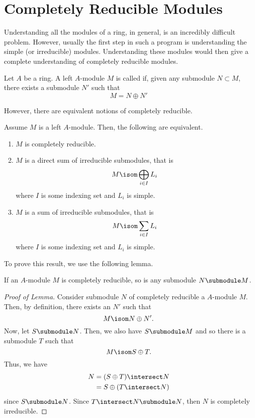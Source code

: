 \documentclass[11pt,leqno,oneside]{amsbook}
\numberwithin{thm}{section}
\begin{document}
\section{Completely Reducible Modules}
Understanding all the modules of a ring, in general, is an incredibly
difficult problem. However, usually the first step in such a program
is understanding the simple (or irreducible) modules. Understanding
these modules would then give a complete understanding of completely
reducible modules.
\begin{defn}
  Let \(A\) be a ring. A left \(A\)-module \(M\) is called
   if, given any submodule \(N \subset M\),
  there exists a submodule \(N'\) such that \[
    M = N \oplus N'
  \]
\end{defn}
However, there are equivalent notions of completely reducible.
\begin{thm}\label{cr-module-equivs}
  Assume \(M\) is a left \(A\)-module. Then, the following are
  equivalent.
  \begin{enumerate}
  \item \(M\) is completely reducible.
  \item \(M\) is a direct sum of irreducible submodules, that is \[
      M \isom \bigoplus_{i \in I} L_i
    \]
    where \(I\) is some indexing set and \(L_i\) is simple.
  \item \(M\) is a sum of irreducible submodules, that is \[
      M \isom \sum_{i \in I} L_i
    \]
    where \(I\) is some indexing set and \(L_i\) is simple.
  \end{enumerate}
\end{thm}
To prove this result, we use the following lemma.
\begin{lem}
  If an \(A\)-module \(M\) is completely reducible, so is any
  submodule \(N \submodule M\).
\end{lem}
\begin{proof}[Proof of Lemma]
  Consider submodule \(N\) of completely reducible a \(A\)-module
  \(M\). Then, by definition, there exists an \(N'\) such that \[
    M \isom N \oplus N'.
  \]
  Now, let \(S \submodule N\). Then, we also have \(S \submodule M\)
  and so there is a submodule \(T\) such that \[
    M \isom S \oplus T.
  \]
  Thus, we have
  \begin{align*}
    N & = (S \oplus T) \intersect N \\
      & = S \oplus (T \intersect N)
  \end{align*}
  since \(S \submodule N\). Since \(T \intersect N \submodule N\),
  then \(N\) is completely irreducible.
\end{proof}
\end{document}
